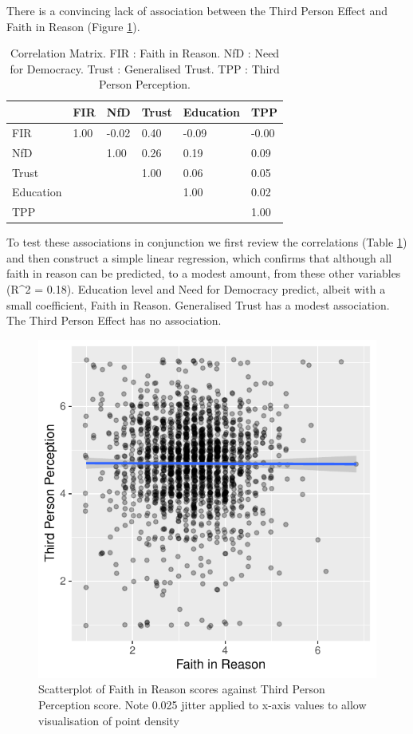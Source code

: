 \documentclass[
  ,jou,floatsintext]{apa6}
\begin{document}
There is a convincing lack of association between the Third Person Effect and Faith in Reason (Figure \ref{fig:tpe}).

\begin{table}

\caption{\label{tab:cortable}Correlation Matrix. FIR : Faith in Reason. NfD : Need for Democracy. Trust : Generalised Trust. TPP : Third Person Perception.}
\centering
\begin{tabular}[t]{l|l|l|l|l|l}
\hline
  & FIR  & NfD  & Trust  & Education  & TPP \\
\hline
FIR & 1.00 & -0.02 & 0.40 & -0.09 & -0.00\\
\hline
NfD &  & 1.00 & 0.26 & 0.19 & 0.09\\
\hline
Trust &  &  & 1.00 & 0.06 & 0.05\\
\hline
Education &  &  &  & 1.00 & 0.02\\
\hline
TPP &  &  &  &  & 1.00\\
\hline
\end{tabular}
\end{table}

To test these associations in conjunction we first review the correlations (Table \ref{tab:cortable}) and then construct a simple linear regression, which confirms that although all faith in reason can be predicted, to a modest amount, from these other variables (R\^{}2 = 0.18). Education level and Need for Democracy predict, albeit with a small coefficient, Faith in Reason. Generalised Trust has a modest association. The Third Person Effect has no association.

\begin{figure}

{\centering \includegraphics[width=0.75\linewidth]{faithinreason_files/figure-latex/tpe-1} 

}

\caption{Scatterplot of Faith in Reason scores against Third Person Perception score. Note 0.025 jitter applied to x-axis values to allow visualisation of point density}\label{fig:tpe}
\end{figure}
\end{document}
